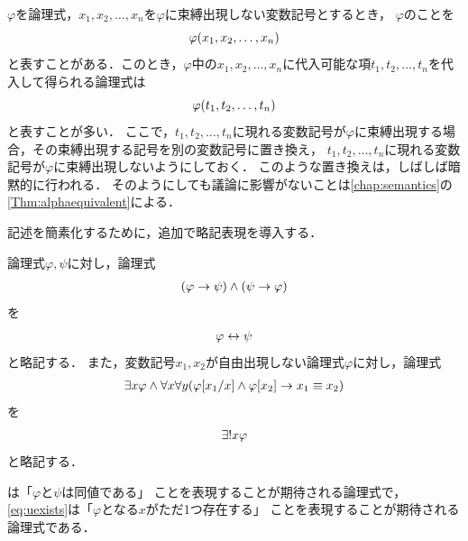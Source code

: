 
\begin{Note}
	\(\varphi\)を論理式，\(x_1, x_2, \dots, x_n\)を\(\varphi\)に束縛出現しない変数記号とするとき，
	\(\varphi\)のことを
	\begin{equation}
		\apply{\varphi}{x_1, x_2, \dots, x_n}
		\label{eq:freevariablefunction}
	\end{equation}
	と表すことがある．このとき，\(\varphi\)中の\(x_1, x_2, \dots, x_n\)に代入可能な項\(t_1, t_2, \dots, t_n\)を代入して得られる論理式は
	\begin{equation}
		\apply{\varphi}{t_1, t_2, \dots, t_n}
		\label{eq:freevariablefunctionsubstitution}
	\end{equation}
	と表すことが多い．
	ここで，\(t_1, t_2, \dots, t_n\)に現れる変数記号が\(\varphi\)に束縛出現する場合，その束縛出現する記号を別の変数記号に置き換え，
	\(t_1, t_2, \dots, t_n\)に現れる変数記号が\(\varphi\)に束縛出現しないようにしておく．
	このような置き換えは，しばしば暗黙的に行われる．
	そのようにしても議論に影響がないことは\cref{chap:semantics}の\cref{Thm:alphaequivalent}による．
\end{Note}

記述を簡素化するために，追加で略記表現を導入する．

\begin{Def} \label{Def:AbbreviatioForFormula}
	論理式\(\varphi, \psi\)に対し，論理式
	\begin{align*}
		\paren{\varphi \to \psi} \land \paren{\psi \to \varphi}
	\end{align*}
	を
	\begin{equation}
		\varphi \leftrightarrow \psi
		\label{eq:formulaequiv}
	\end{equation}
	と略記する．
	また，変数記号\(x_1, x_2\)が自由出現しない論理式\(\varphi\)に対し，論理式
	\begin{align*}
		\exists x \varphi \land \forall x \forall y \paren{\subst{\varphi}{x_1/x} \land \subst{\varphi}{x_2} \to x_1 \objeq x_2}
	\end{align*}
	を
	\begin{equation}
		{\exists !} x \varphi
		\label{eq:uexists}
	\end{equation}
	と略記する．

	は「\(\varphi\)と\(\psi\)は同値である」
	ことを表現することが期待される論理式で，
	\cref{eq:uexists}は「\(\varphi\)となる\(x\)がただ1つ存在する」
	ことを表現することが期待される論理式である．
\end{Def}


